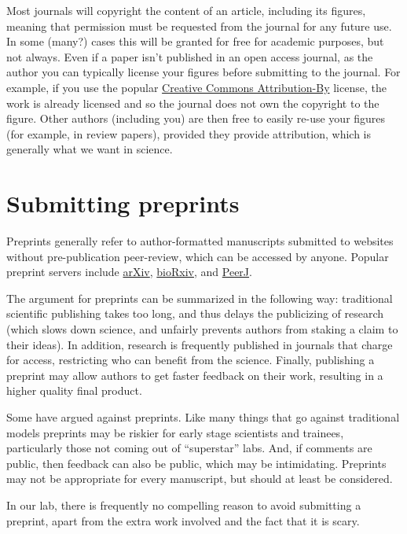 \documentclass[letterpaper,oneside,11pt,article, portrait]{memoir}
\begin{document}
Most journals will copyright the content of an article, including its figures, meaning that permission must be requested from the journal for any future use. In some (many?) cases this will be granted for free for academic purposes, but not always. Even if a paper isn't published in an open access journal, as the author you can typically license your figures before submitting to the journal. For example, if you use the popular \href{http://creativecommons.org/licenses/by/4.0/}{Creative Commons Attribution-By} license, the work is already licensed and so the journal does not own the copyright to the figure. Other authors (including you) are then free to easily re-use your figures (for example, in review papers), provided they provide attribution, which is generally what we want in science. 

\chapter{Submitting preprints} \label{preprint}

Preprints generally refer to author-formatted manuscripts submitted to websites without pre-publication peer-review, which can be accessed by anyone. Popular preprint servers include \href{http://arxiv.org}{arXiv},  \href{http://biorxiv.org}{bioRxiv}, and \href{http://peerj.com}{PeerJ}.

The argument for preprints can be summarized in the following way: traditional scientific publishing takes too long, and thus delays the publicizing of research (which slows down science, and unfairly prevents authors from staking a claim to their ideas). In addition, research is frequently published in journals that charge for access, restricting who can benefit from the science. Finally, publishing a preprint may allow authors to get faster feedback on their work, resulting in a higher quality final product.

Some have argued against preprints. Like many things that go against traditional models preprints may be riskier for early stage scientists and trainees, particularly those not coming out of ``superstar'' labs. And, if comments are public, then feedback can also be public, which may be intimidating. Preprints may not be appropriate for every manuscript, but should at least be considered. 

In our lab, there is frequently no compelling reason to avoid submitting a preprint, apart from the extra work involved and the fact that it is scary.
\end{document}
